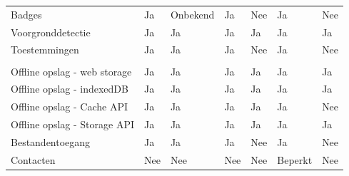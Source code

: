 \begin{table}[]
\begin{tabular}{p{6cm}p{13mm}p{15mm}p{13mm}p{13mm}p{13mm}p{13mm}}
				   Badges & \cellcolor{green!40} Ja  & \cellcolor{orange!50} Onbekend & \cellcolor{green!40} Ja & \cellcolor{red!50} Nee  & \cellcolor{green!40} Ja & \cellcolor{red!50} Nee \\
				   
				   Voorgronddetectie & \cellcolor{green!40} Ja  & \cellcolor{green!40} Ja & \cellcolor{green!40} Ja  & \cellcolor{green!40} Ja & \cellcolor{green!40} Ja & \cellcolor{green!40} Ja \\
				   
				   Toestemmingen & \cellcolor{green!40} Ja  & \cellcolor{green!40} Ja & \cellcolor{green!40} Ja & \cellcolor{red!50} Nee  & \cellcolor{green!40} Ja & \cellcolor{red!50} Nee \\
				   
				   &  & &  &  &  &  \\
				   
				   Offline opslag - web storage & \cellcolor{green!40} Ja  & \cellcolor{green!40} Ja & \cellcolor{green!40} Ja  & \cellcolor{green!40} Ja & \cellcolor{green!40} Ja & \cellcolor{green!40} Ja \\
				   
				   Offline opslag - indexedDB & \cellcolor{green!40} Ja  & \cellcolor{green!40} Ja & \cellcolor{green!40} Ja  & \cellcolor{green!40} Ja & \cellcolor{green!40} Ja & \cellcolor{green!40} Ja \\
				   
				   Offline opslag - Cache API & \cellcolor{green!40} Ja  & \cellcolor{green!40} Ja & \cellcolor{green!40} Ja  & \cellcolor{green!40} Ja & \cellcolor{green!40} Ja & \cellcolor{red!50} Nee\\
				   
				   Offline opslag - Storage API & \cellcolor{green!40} Ja  & \cellcolor{green!40} Ja & \cellcolor{green!40} Ja  & \cellcolor{green!40} Ja & \cellcolor{green!40} Ja & \cellcolor{green!40} Ja \\
				   
				   Bestandentoegang & \cellcolor{green!40} Ja  & \cellcolor{green!40} Ja & \cellcolor{green!40} Ja & \cellcolor{red!50} Nee  & \cellcolor{green!40} Ja & \cellcolor{red!50} Nee \\
				   
				   Contacten &  \cellcolor{red!50} Nee  &  \cellcolor{red!50} Nee &  \cellcolor{red!50} Nee  & \cellcolor{red!50} Nee &  \cellcolor{orange!50} Beperkt &  \cellcolor{red!50} Nee \\
				   

\end{tabular}
\end{table}
